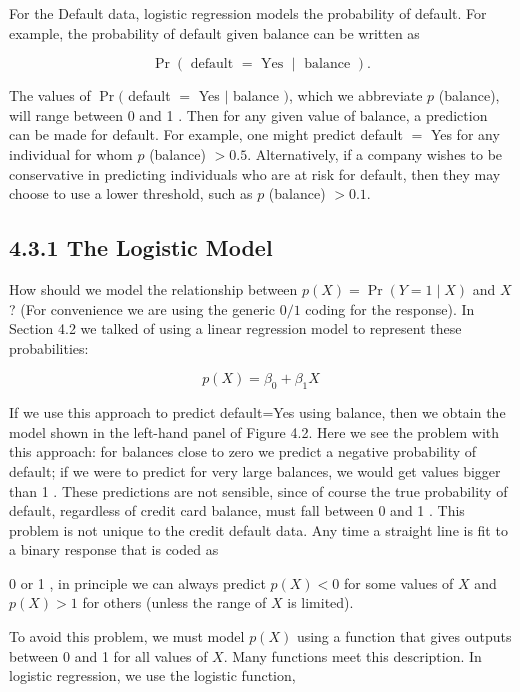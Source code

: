 \documentclass[10pt]{article}
\begin{document}
For the Default data, logistic regression models the probability of default. For example, the probability of default given balance can be written as

$$
\operatorname{Pr}(\text { default }=\text { Yes } \mid \text { balance }) .
$$

The values of $\operatorname{Pr}($ default $=$ Yes $\mid$ balance $)$, which we abbreviate $p$ (balance), will range between 0 and 1 . Then for any given value of balance, a prediction can be made for default. For example, one might predict default $=$ Yes for any individual for whom $p$ (balance) $>0.5$. Alternatively, if a company wishes to be conservative in predicting individuals who are at risk for default, then they may choose to use a lower threshold, such as $p$ (balance) $>0.1$.

\subsection*{4.3.1 The Logistic Model}
How should we model the relationship between $p(X)=\operatorname{Pr}(Y=1 \mid X)$ and $X$ ? (For convenience we are using the generic $0 / 1$ coding for the response). In Section 4.2 we talked of using a linear regression model to represent these probabilities:


\begin{equation*}
p(X)=\beta_{0}+\beta_{1} X \tag{4.1}
\end{equation*}


If we use this approach to predict default=Yes using balance, then we obtain the model shown in the left-hand panel of Figure 4.2. Here we see the problem with this approach: for balances close to zero we predict a negative probability of default; if we were to predict for very large balances, we would get values bigger than 1 . These predictions are not sensible, since of course the true probability of default, regardless of credit card balance, must fall between 0 and 1 . This problem is not unique to the credit default data. Any time a straight line is fit to a binary response that is coded as


0 or 1 , in principle we can always predict $p(X)<0$ for some values of $X$ and $p(X)>1$ for others (unless the range of $X$ is limited).

To avoid this problem, we must model $p(X)$ using a function that gives outputs between 0 and 1 for all values of $X$. Many functions meet this description. In logistic regression, we use the logistic function,
\end{document}
